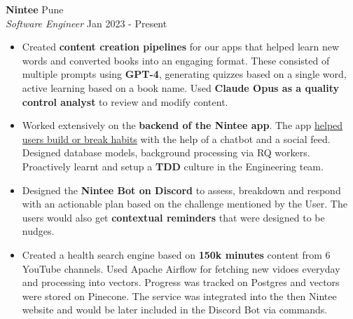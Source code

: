 \documentclass[a4paper]{article}
\begin{document}
\vspace{1mm}
\textbf{Nintee} \hfill Pune\\
\textit{Software Engineer} \hfill Jan 2023 - Present\\
\vspace{-1mm}
\begin{itemize} \itemsep 1pt
    \item Created \textbf{content creation pipelines} for our apps that helped learn new words and converted books into an engaging format. These consisted of multiple prompts using \textbf{GPT-4}, generating quizzes based on a single word, active learning based on a book name. Used \textbf{Claude Opus as a quality control analyst} to review and modify content.
    \item Worked extensively on the \textbf{backend of the Nintee app}. The app \href{https://www.trustpilot.com/review/nintee.com}{helped users build or break habits} with the help of a chatbot and a social feed. Designed database models, background processing via RQ workers. Proactively learnt and setup a \textbf{TDD} culture in the Engineering team.
    \item Designed the \textbf{Nintee Bot on Discord} to assess, breakdown and respond with an actionable plan based on the challenge mentioned by the User. The users would also get \textbf{contextual reminders} that were designed to be nudges.
    \item Created a health search engine based on \textbf{150k minutes} content from 6 YouTube channels. Used Apache Airflow for fetching new vidoes everyday and processing into vectors. Progress was tracked on Postgres and vectors were stored on Pinecone. The service was integrated into the then Nintee website and would be later included in the Discord Bot via commands.
\end{itemize}

\vspace*{2mm}
\end{document}

